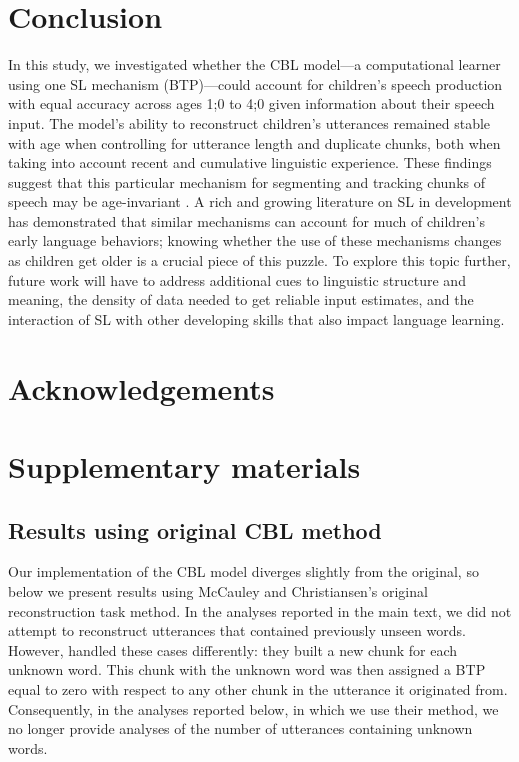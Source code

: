 \documentclass{article}
\begin{document}
\section{Conclusion}
In this study, we investigated whether the CBL model---a computational learner using one SL mechanism (BTP)---could account for children's speech production with equal accuracy across ages 1;0 to 4;0 given information about their speech input. The model's ability to reconstruct children's utterances remained stable with age when controlling for utterance length and duplicate chunks, both when taking into account recent and cumulative linguistic experience. These findings suggest that this particular mechanism for segmenting and tracking chunks of speech may be age-invariant \cite{raviv2018developmental, shufaniya2018statistical}. A rich and growing literature on SL in development has demonstrated that similar mechanisms can account for much of children's early language behaviors; knowing whether the use of these mechanisms changes as children get older is a crucial piece of this puzzle. To explore this topic further, future work will have to address additional cues to linguistic structure and meaning, the density of data needed to get reliable input estimates, and the interaction of SL with other developing skills that also impact language learning.


\section*{Acknowledgements}




\newpage

\section{Supplementary materials}

\subsection{Results using original CBL method}

Our implementation of the CBL model diverges slightly from the original, so below we present results using McCauley and Christiansen's original \citeyear{mccauley2011learning} reconstruction task method. In the analyses reported in the main text, we did not attempt to reconstruct utterances that contained previously unseen words. However,  handled these cases differently: they built a new chunk for each unknown word. This chunk with the unknown word was then assigned a BTP equal to zero with respect to any other chunk in the utterance it originated from. Consequently, in the analyses reported below, in which we use their method, we no longer provide analyses of the number of utterances containing unknown words.
\end{document}
